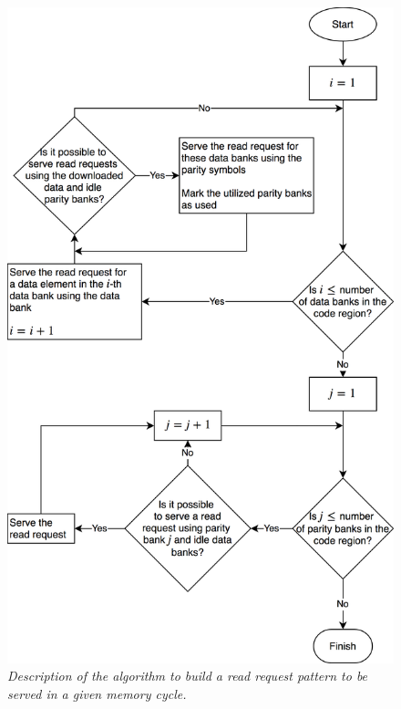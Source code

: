 
\begin{figure}[t!]
	\includegraphics[width=0.96\linewidth]{fig/read_pattern_algo.png}
	\caption{{\it{Description of the algorithm to build a read request pattern to be served in a given memory cycle.}}}
	\label{fig:readAlgo}
\end{figure}
